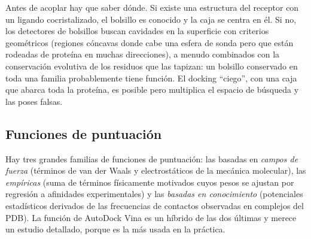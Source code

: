 Antes de acoplar hay que saber dónde. Si existe una estructura del receptor con un ligando cocristalizado, el bolsillo es conocido y la caja se centra en él. Si no, los detectores de bolsillos buscan cavidades en la superficie con criterios geométricos (regiones cóncavas donde cabe una esfera de sonda pero que están rodeadas de proteína en muchas direcciones), a menudo combinados con la conservación evolutiva de los residuos que las tapizan: un bolsillo conservado en toda una familia probablemente tiene función. El docking ``ciego'', con una caja que abarca toda la proteína, es posible pero multiplica el espacio de búsqueda y las poses falsas.

\subsection{Funciones de puntuación}

Hay tres grandes familias de funciones de puntuación: las basadas en \emph{campos de fuerza} (términos de van der Waals y electrostáticos de la mecánica molecular), las \emph{empíricas} (suma de términos físicamente motivados cuyos pesos se ajustan por regresión a afinidades experimentales) y las \emph{basadas en conocimiento} (potenciales estadísticos derivados de las frecuencias de contactos observadas en complejos del PDB). La función de AutoDock Vina es un híbrido de las dos últimas y merece un estudio detallado, porque es la más usada en la práctica.

